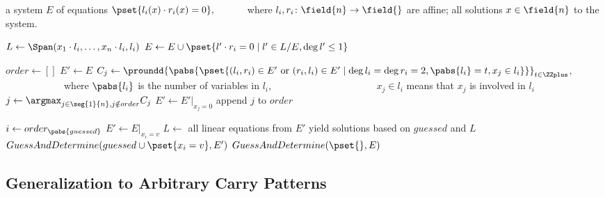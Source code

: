 \begin{algorithm}
    \begin{algorithmic}[1]
    \Require a system $E$ of equations $\pset{l_i(x)\cdot r_i(x) = 0},$
    \Statex~~~~~~where $l_i,r_i\colon \field{n} \to \field{}$ are affine;
    \Ensure all solutions $x\in \field{n}$ to the system.
    
    \Statex
        \State $L \gets \Span(x_1\cdot l_i,\ldots,x_n\cdot l_i, l_i)$
        \State $E \gets E \cup \pset{l'\cdot r_i=0 \mid l' \in L/E, \deg{l'} \le 1}$ 
    \EndFor
    
    \Statex
    \State $order \gets []$
    \State $E' \gets E$
        \State $C_j \gets \proundd{\pabs{\pset{
            (l_i,r_i) \in E' ~\text{or}~(r_i,l_i) \in E'
            \mid
            \deg{l_i} = \deg{r_i} = 2,
            \pabs{l_i} = t,
            x_j \in l_i
        }}}_{t \in \ZZplus}$,
        \Statex ~~~~~~~~~~~~where $\pabs{l_i}$ is the number of variables in $l_i$,
        \Statex ~~~~~~~~~~~~~~~~~~~~~$x_j \in l_i$ means that $x_j$ is involved in $l_i$
        \State $j \gets \argmax_{j \in \seg{1}{n},j \notin order} C_j$
        \State $E' \gets E'\big|_{x_j=0}$ 
        \State append $j$ to $order$
    \EndWhile
    
    \Statex
        \State $i \gets order_{\pabs{guessed}}$
            \State $E' \gets E\big|_{x_i = v}$
            \State $L \gets$ all linear equations from $E'$
                \State yield solutions based on $guessed$ and $L$
                \State $GuessAndDetermine(guessed \cup \pset{x_i=v}, E')$
            \EndIf
        \EndFor
    \EndFunction
    \State $GuessAndDetermine(\pset{}, E)$
    \end{algorithmic}
\end{algorithm}


\subsection{Generalization to Arbitrary Carry Patterns}

